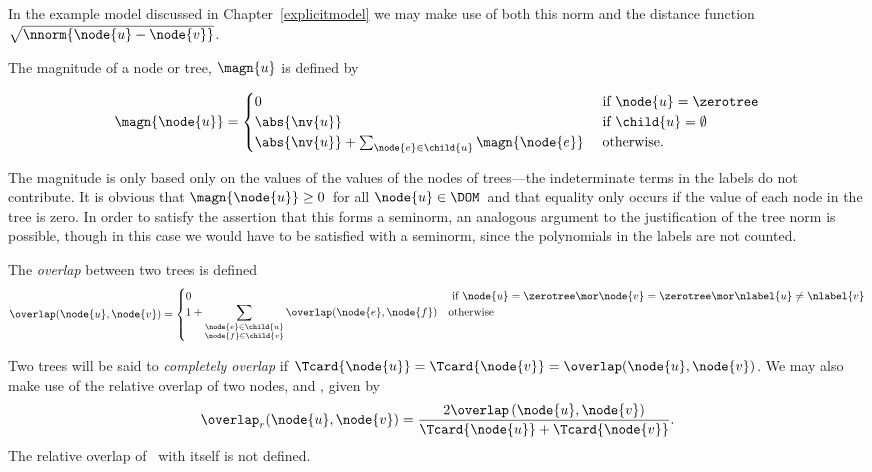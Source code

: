 In the example model discussed in Chapter~\ref{explicitmodel} we may
make use of both this norm and the distance function
$\sqrt{\nnorm{\node{u}-\node{v}}}$.

The magnitude of a node or tree, $\magn{u}$ is defined by
\begin{definition}\label{magnitude}
  \begin{align*}
    \magn{\node{u}} = \begin{cases}
      0 & \text{ if } \node{u} = \zerotree \\
      \abs{\nv{u}} & \text{ if }\child{u} = \emptyset \\
      \abs{\nv{u}} + \sum_{\node{e}\in\child{u}}\magn{\node{e}} & \text{ otherwise.}
    \end{cases}
  \end{align*}
\end{definition}

The magnitude is only based only on the values of the values of the
nodes of trees---the indeterminate terms in the labels do not
contribute.  It is obvious that $\magn{\node{u}} \geq 0$\ for all $\node{u} \in
\DOM$\ and that equality only occurs if the value of each node in the
tree  is zero. In order to satisfy the assertion that this
forms a seminorm, an analogous argument to the justification of
the tree norm is possible, though in this case we would have to
be satisfied with a seminorm, since the polynomials in the labels are not counted.

\begin{definition}
  The \emph{overlap} between two trees is defined
  \[
  \overlap(\node{u},\node{v}) = \begin{cases}
    0 & \text{ if } \node{u} = \zerotree \mor \node{v} = \zerotree \mor \nlabel{u}\neq\nlabel{v} \\
    1 + \displaystyle\sum_{\substack{\node{e}\in\child{u} \\ \node{f}\in\child{v}}} \overlap(\node{e},\node{f}) & \text{otherwise}
  \end{cases}
  \]

  Two trees will be said to \emph{completely overlap} if
  $\Tcard{\node{u}} = \Tcard{\node{v}} = \overlap(\node{u},\node{v})$.
  We may also make use of the relative overlap of two nodes, 
  and , given by
  \begin{equation*}
    \overlap_{r}(\node{u},\node{v}) = \dfrac{2\overlap\left(\node{u},\node{v}\right)}{\Tcard{\node{u}}+\Tcard{\node{v}}}.
  \end{equation*} The relative overlap of  \tzerotree\ with itself is
  not defined.
\end{definition}

